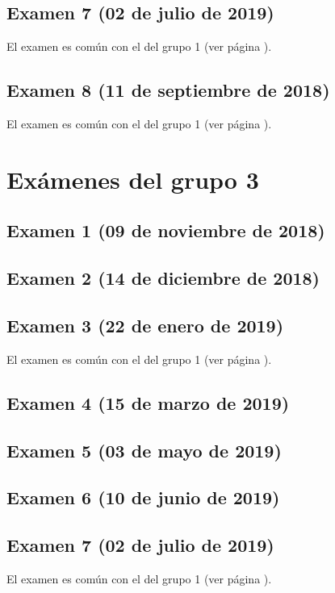 \documentclass[a4paper,12pt,twoside]{book}
\begin{document}
\section{Examen 7 (02 de julio de 2019)}
El examen es común con el del grupo 1 (ver página \pageref{examen_18_19_1_7}).
\section{Examen 8 (11 de septiembre de 2018)}
El examen es común con el del grupo 1 (ver página \pageref{examen_18_19_1_8}).

\chapter{Exámenes del grupo 3}
\section{Examen 1 (09 de noviembre de 2018)}
\section{Examen 2 (14 de diciembre de 2018)}
\section{Examen 3 (22 de enero de 2019)}
El examen es común con el del grupo 1 (ver página \pageref{examen_18_19_4_3}).
\section{Examen 4 (15 de marzo de 2019)}
\section{Examen 5 (03 de mayo de 2019)}
\section{Examen 6 (10 de junio de 2019)}
 \label{examen_18_19_3_6}
\section{Examen 7 (02 de julio de 2019)}
El examen es común con el del grupo 1 (ver página \pageref{examen_18_19_1_7}).
\end{document}
